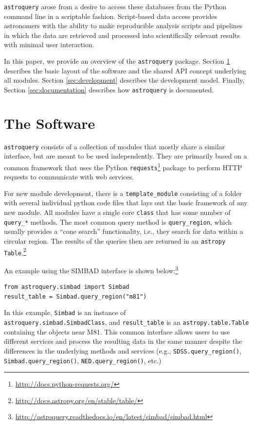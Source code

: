 \documentclass[twocolumn]{aastex62}
\newcommand{\package}[1]{\texttt{#1}\xspace}
\newcommand{\astroquery}{\package{astroquery}}
\newcommand{\astropypkg}{\package{astropy}}
\begin{document}
\astroquery arose from a desire to access these databases from the Python
command line in a scriptable fashion.  Script-based data access provides
astronomers with the ability to make reproducible analysis scripts and
pipelines in which the data are retrieved and processed into scientifically
relevant results with minimal user interaction.

In this paper, we provide an overview of the \astroquery package.  Section
\ref{sec:software} describes the basic layout of the software and the shared
API concept underlying all modules.  Section \ref{sec:development} describes
the development model.  Finally, Section \ref{sec:documentation} describes how
\astroquery is documented.



\section{The Software}
\label{sec:software}
\astroquery consists of a collection of modules that mostly share a similar
interface, but are meant to be used independently.  They are primarily based on
a common framework that uses the Python
\package{requests}\footnote{\url{http://docs.python-requests.org/}} package to
perform HTTP requests to communicate with web services.

For new module development, there is a \texttt{template\_module} consisting of a
folder with several individual python code files that lays
out the basic framework of any new module.  All modules have a single core
\texttt{class} that has some number of \texttt{query\_*} methods.
The most common query method is \texttt{query\_region}, which usually
provides a ``cone search'' functionality, i.e., they search for data within a
circular region. The results of
the queries then are returned in an \astropypkg
\citep{Astropy-Collaboration2018, Astropy-Collaboration2013}
\texttt{Table}.\footnote{\url{http://docs.astropy.org/en/stable/table/}}

An example using the SIMBAD interface is shown
below:\footnote{\url{http://astroquery.readthedocs.io/en/latest/simbad/simbad.html}}
\begin{lstlisting}[caption=Query SIMBAD for a region around M81]
from astroquery.simbad import Simbad
result_table = Simbad.query_region("m81")
\end{lstlisting}
In this example, \texttt{Simbad} is an instance of \\
\texttt{astroquery.simbad.SimbadClass}, and \texttt{result\_table} is an
\texttt{astropy.table.Table} containing the objects near M81.
This common interface allows users to use different services and process
the resulting data in the same manner despite the differences in the underlying
methods and services (e.g., \texttt{SDSS.query\_region()},
\texttt{Simbad.query\_region()}, \texttt{NED.query\_region()}, etc.)
\end{document}
